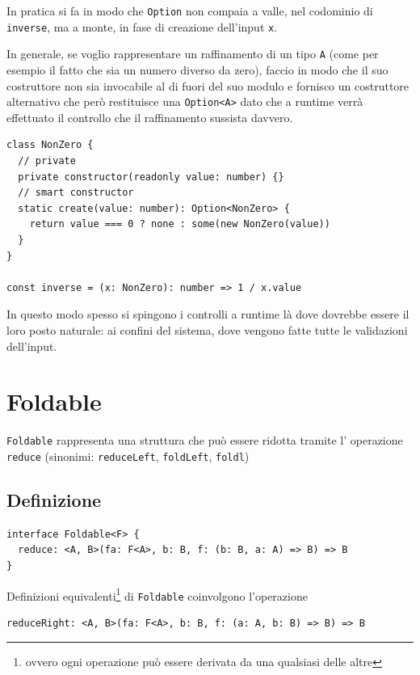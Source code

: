 \documentclass[12pt]{article}
\begin{document}
In pratica si fa in modo che \texttt{Option} non compaia a valle, nel codominio di \texttt{inverse},
ma a monte, in fase di creazione dell'input \texttt{x}.

In generale, se voglio rappresentare un raffinamento di un tipo \texttt{A} (come per esempio il fatto che sia un numero diverso da zero),
faccio in modo che il suo costruttore non sia invocabile al di fuori del suo modulo e fornisco un costruttore alternativo
che però restituisce una \texttt{Option<A>} dato che a runtime verrà effettuato il controllo che il raffinamento sussista davvero.

\begin{verbatim}
class NonZero {
  // private
  private constructor(readonly value: number) {}
  // smart constructor
  static create(value: number): Option<NonZero> {
    return value === 0 ? none : some(new NonZero(value))
  }
}

const inverse = (x: NonZero): number => 1 / x.value
\end{verbatim}

In questo modo spesso si spingono i controlli a runtime là dove dovrebbe essere il loro posto naturale: ai confini del sistema,
dove vengono fatte tutte le validazioni dell'input.

\newpage

\section{Foldable}

\texttt{Foldable} rappresenta una struttura che può essere ridotta tramite l' operazione \texttt{reduce}
(sinonimi: \texttt{reduceLeft}, \texttt{foldLeft}, \texttt{foldl})

\subsection{Definizione}

\begin{verbatim}
interface Foldable<F> {
  reduce: <A, B>(fa: F<A>, b: B, f: (b: B, a: A) => B) => B
}
\end{verbatim}

Definizioni equivalenti\footnote{ovvero ogni operazione può essere derivata da una qualsiasi delle altre} di \texttt{Foldable}
coinvolgono l'operazione

\begin{verbatim}
reduceRight: <A, B>(fa: F<A>, b: B, f: (a: A, b: B) => B) => B
\end{verbatim}
\end{document}
